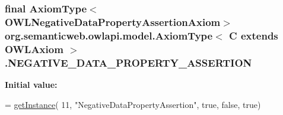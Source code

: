 \hypertarget{classorg_1_1semanticweb_1_1owlapi_1_1model_1_1_axiom_type_3_01_c_01extends_01_o_w_l_axiom_01_4_a3a27d5f41824efbe9cde732330ef0247}{
\subsubsection[{N\-E\-G\-A\-T\-I\-V\-E\-\_\-\-D\-A\-T\-A\-\_\-\-P\-R\-O\-P\-E\-R\-T\-Y\-\_\-\-A\-S\-S\-E\-R\-T\-I\-O\-N}]{\setlength{\rightskip}{0pt plus 5cm}final {\bf Axiom\-Type}$<${\bf O\-W\-L\-Negative\-Data\-Property\-Assertion\-Axiom}$>$ org.\-semanticweb.\-owlapi.\-model.\-Axiom\-Type$<$ C extends {\bf O\-W\-L\-Axiom} $>$.N\-E\-G\-A\-T\-I\-V\-E\-\_\-\-D\-A\-T\-A\-\_\-\-P\-R\-O\-P\-E\-R\-T\-Y\-\_\-\-A\-S\-S\-E\-R\-T\-I\-O\-N\hspace{0.3cm}{\ttfamily [static]}}}\label{classorg_1_1semanticweb_1_1owlapi_1_1model_1_1_axiom_type_3_01_c_01extends_01_o_w_l_axiom_01_4_a3a27d5f41824efbe9cde732330ef0247}
{\bfseries Initial value\-:}
\begin{DoxyCode}
= \hyperlink{classorg_1_1semanticweb_1_1owlapi_1_1model_1_1_axiom_type_3_01_c_01extends_01_o_w_l_axiom_01_4_a485e011845434c518471707a87f09339}{getInstance}(
            11, \textcolor{stringliteral}{"NegativeDataPropertyAssertion"}, \textcolor{keyword}{true}, \textcolor{keyword}{false}, \textcolor{keyword}{true})
\end{DoxyCode}
